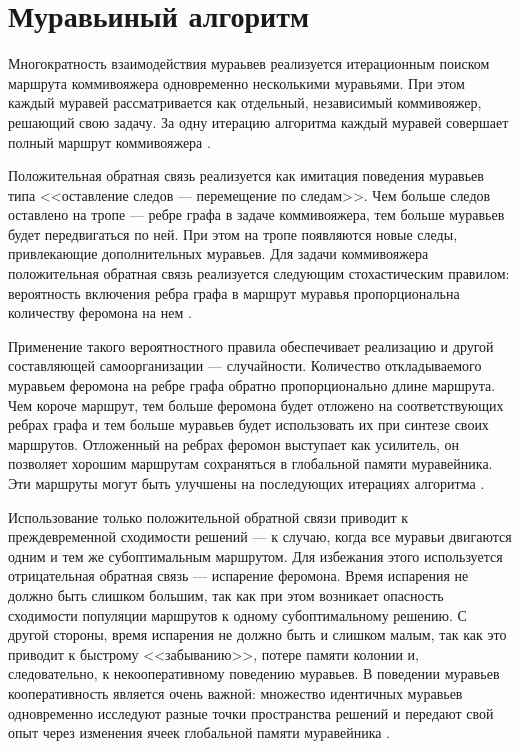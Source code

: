 \section{Муравьиный алгоритм}

Многократность взаимодействия мураьвев реализуется итерационным поиском маршрута коммивояжера одновременно несколькими муравьями. 
При этом каждый муравей рассматривается как отдельный, независимый коммивояжер, решающий свою задачу. 
За одну итерацию алгоритма каждый муравей совершает полный маршрут коммивояжера \cite{Shtovba2003}.

Положительная обратная связь реализуется как имитация поведения муравьев типа <<оставление следов --- перемещение по следам>>. 
Чем больше следов оставлено на тропе --- ребре графа в задаче коммивояжера, тем больше муравьев будет
передвигаться по ней. 
При этом на тропе появляются новые следы, привлекающие дополнительных муравьев. 
Для задачи коммивояжера положительная обратная связь реализуется следующим стохастическим правилом: вероятность включения ребра графа в маршрут муравья пропорциональна количеству феромона на нем \cite{Shtovba2003}.

Применение такого вероятностного правила обеспечивает реализацию и другой составляющей самоорганизации --- случайности. 
Количество откладываемого муравьем феромона на ребре графа обратно пропорционально длине маршрута. 
Чем короче маршрут, тем больше феромона будет отложено на соответствующих ребрах графа и тем больше муравьев будет использовать их при синтезе своих маршрутов. 
Отложенный на ребрах феромон выступает как усилитель, он позволяет хорошим маршрутам сохраняться в глобальной памяти муравейника. 
Эти маршруты могут быть улучшены на последующих итерациях алгоритма \cite{Shtovba2003}.

Использование только положительной обратной связи приводит к преждевременной сходимости решений --- к случаю, когда все муравьи двигаются одним и тем же субоптимальным маршрутом. 
Для избежания этого используется отрицательная обратная связь --- испарение феромона. 
Время испарения не должно быть слишком большим, так как при этом возникает опасность сходимости популяции маршрутов к одному субоптимальному решению. 
С другой стороны, время испарения не должно быть и слишком малым, так как это приводит к быстрому <<забыванию>>, потере памяти колонии и, следовательно, к некооперативному поведению муравьев. 
В поведении муравьев кооперативность является очень важной: множество идентичных муравьев одновременно исследуют разные точки пространства решений и передают свой опыт через изменения ячеек глобальной памяти муравейника \cite{Shtovba2003}.

